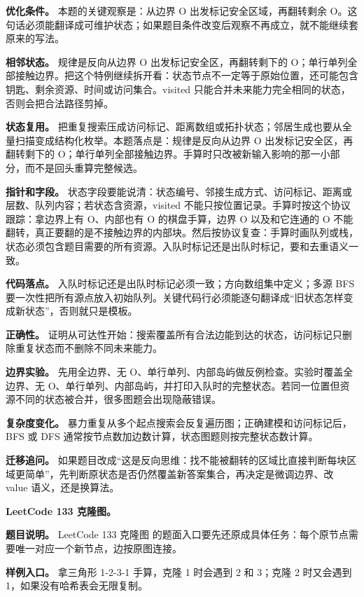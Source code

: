 \textbf{优化条件。} 本题的关键观察是：从边界 O 出发标记安全区域，再翻转剩余 O。这句话必须能翻译成可维护状态；如果题目条件改变后观察不再成立，就不能继续套原来的写法。

\textbf{相邻状态。} 规律是反向从边界 O 出发标记安全区，再翻转剩下的 O；单行单列全部接触边界。把这个特例继续拆开看：状态节点不一定等于原始位置，还可能包含钥匙、剩余资源、时间或访问集合。visited 只能合并未来能力完全相同的状态，否则会把合法路径剪掉。

\textbf{状态复用。} 把重复搜索压成访问标记、距离数组或拓扑状态；邻居生成也要从全量扫描变成结构化枚举。本题落点是：规律是反向从边界 O 出发标记安全区，再翻转剩下的 O；单行单列全部接触边界。手算时只改被新输入影响的那一小部分，而不是回头重算完整候选。

\textbf{指针和字段。} 状态字段要能说清：状态编号、邻接生成方式、访问标记、距离或层数、队列内容；若状态含资源，visited 不能只按位置记录。手算时按这个协议跟踪：拿边界上有 O、内部也有 O 的棋盘手算，边界 O 以及和它连通的 O 不能翻转，真正要翻的是不接触边界的内部块。然后按协议复查：手算时画队列或栈，状态必须包含题目需要的所有资源。入队时标记还是出队时标记，要和去重语义一致。

\textbf{代码落点。} 入队时标记还是出队时标记必须一致；方向数组集中定义；多源 BFS 要一次性把所有源点放入初始队列。关键代码行必须能逐句翻译成“旧状态怎样变成新状态”，否则就只是模板。

\textbf{正确性。} 证明从可达性开始：搜索覆盖所有合法边能到达的状态，访问标记只删除重复状态而不删除不同未来能力。

\textbf{边界实验。} 先用全边界、无 O、单行单列、内部岛屿做反例检查。实验时覆盖全边界、无 O、单行单列、内部岛屿，并打印入队时的完整状态。若同一位置但资源不同的状态被合并，很多图题会出现隐蔽错误。

\textbf{复杂度变化。} 暴力重复从多个起点搜索会反复遍历图；正确建模和访问标记后，BFS 或 DFS 通常按节点数加边数计算，状态图题则按完整状态数计算。

\textbf{迁移追问。} 如果题目改成“这是反向思维：找不能被翻转的区域比直接判断每块区域更简单”，先判断原状态是否仍然覆盖新答案集合，再决定是微调边界、改 value 语义，还是换算法。

\noindent\textbf{LeetCode 133 克隆图。}

\textbf{题目说明。} LeetCode 133 克隆图 的题面入口要先还原成具体任务：每个原节点需要唯一对应一个新节点，边按原图连接。

\textbf{样例入口。} 拿三角形 1-2-3-1 手算，克隆 1 时会遇到 2 和 3；克隆 2 时又会遇到 1，如果没有哈希表会无限复制。

